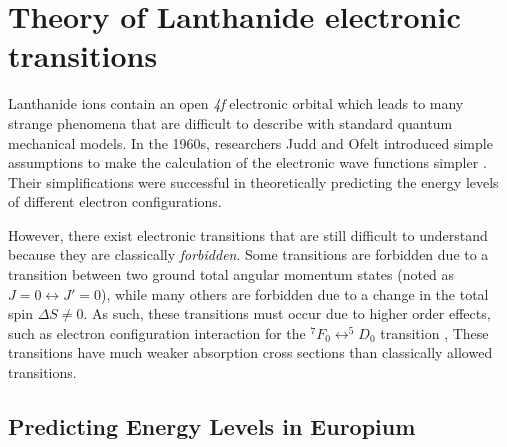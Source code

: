 \section{Theory of Lanthanide electronic transitions}\label{sec:theory_eu}

Lanthanide ions contain an open \textsl{4f} electronic orbital which leads to
many strange phenomena that are difficult to describe with standard quantum
mechanical models\cite{Wybourne:1968ez}. In the 1960s, researchers Judd and
Ofelt introduced simple assumptions to make the calculation of the electronic
wave functions simpler \cite{Judd:1962uq,Ofelt:1962kd}. Their simplifications
were successful in theoretically predicting the energy levels of different
electron configurations.

However, there exist electronic transitions that are still difficult to
understand because they are classically \emph{forbidden}. Some transitions are
forbidden due to a transition between two ground total angular momentum states
(noted as $ J=0 \leftrightarrow J'=0 $), while many others are forbidden due to
a change in the total spin $\Delta S \neq 0$. As such, these transitions must
occur due to higher order effects, such as electron configuration interaction
for the $^7F_0 \leftrightarrow ^5D_0$ transition \cite{Jankowski:1981es}, These
transitions have much weaker absorption cross sections than classically allowed
transitions.



\subsection{Predicting Energy Levels in Europium}\label{subsec:predict_eu}

